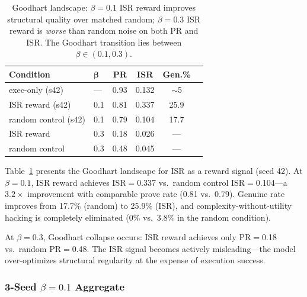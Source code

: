 \documentclass[11pt,a4paper]{article}
\begin{document}
\begin{table}[t]
\centering
\small
\begin{tabular}{llcccc}
\toprule
\textbf{Condition} & $\boldsymbol{\beta}$ & \textbf{PR} & \textbf{ISR} & \textbf{Gen.\%} \\
\midrule
exec-only (s42) & --- & 0.93 & 0.132 & ${\sim}$5 \\
\midrule
ISR reward (s42) & 0.1 & 0.81 & 0.337 & 25.9 \\
random control (s42) & 0.1 & 0.79 & 0.104 & 17.7 \\
\midrule
ISR reward & 0.3 & 0.18 & 0.026 & --- \\
random control & 0.3 & 0.48 & 0.045 & --- \\
\bottomrule
\end{tabular}
\caption{Goodhart landscape: $\beta{=}0.1$ ISR reward improves structural quality over matched random; $\beta{=}0.3$ ISR reward is \emph{worse} than random noise on both PR and ISR. The Goodhart transition lies between $\beta \in (0.1, 0.3)$.}
\label{tab:goodhart}
\end{table}

Table~\ref{tab:goodhart} presents the Goodhart landscape for ISR as a reward signal (seed 42).
At $\beta{=}0.1$, ISR reward achieves ISR$=$0.337 vs.\ random control ISR$=$0.104---a $3.2\times$ improvement with comparable prove rate (0.81 vs.\ 0.79).
Genuine rate improves from 17.7\% (random) to 25.9\% (ISR), and complexity-without-utility hacking is completely eliminated (0\% vs.\ 3.8\% in the random condition).

At $\beta{=}0.3$, Goodhart collapse occurs: ISR reward achieves only PR$=$0.18 vs.\ random PR$=$0.48.
The ISR signal becomes actively misleading---the model over-optimizes structural regularity at the expense of execution success.

\subsubsection{3-Seed $\beta{=}0.1$ Aggregate}
\end{document}
